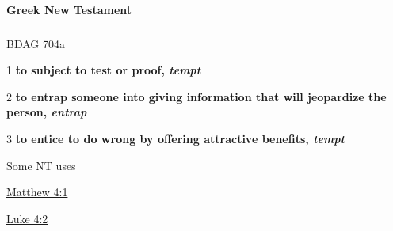 			
			
		\paragraph{Greek New Testament} %
			\label{TEMPTATION-GREEK}
			
			\subparagraph{\texorpdfstring{}{}}
				\label{EKPEIRAZO}
			
				\begin{compactdesc}
					\item[BDAG 704a] \textbf{}
						\begin{compactitem}
							\item[1] \textbf{to subject to test or proof, \textit{tempt}}
							\item[2] \textbf{to entrap someone into giving information that will jeopardize the person, \textit{entrap}}
							\item[3] \textbf{to entice to do wrong by offering attractive benefits, \textit{tempt}}
						\end{compactitem}
				\end{compactdesc}
				
				
				\begin{compactdesc}
					\item[Some NT uses] \textbf{}
						\begin{compactdesc}
							\item[{\hyperref[MATTHEW-4-1]{Matthew 4:1}}]
							\item[{\hyperref[LUKE-4-2]{Luke 4:2}}]
						\end{compactdesc}
				\end{compactdesc}
		
